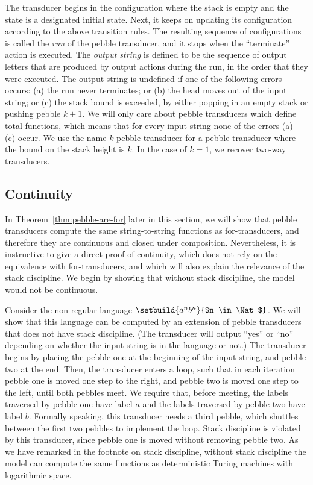 The transducer begins in the configuration where the stack is empty and  the state is a  designated initial state. Next, it keeps on updating its configuration according to the above transition rules. The resulting sequence of configurations is called the \emph{run} of the pebble transducer, and it stops when the ``terminate'' action is executed. The \emph{output string} is defined to be the sequence of output letters that are produced by output actions during the run,  in the order that they were executed.  The output string is undefined if one of the following errors occurs: (a) the run never terminates; or (b) the head moves out of the input string; or (c) the stack bound is exceeded, by either popping in an empty stack or pushing pebble $k+1$. We will only care about pebble transducers which define total functions, which means that for every input string none of the errors (a) -- (c)  occur. 
We use the name $k$-pebble transducer for a pebble transducer where the bound on the stack height is $k$. In the case of $k=1$, 
    we recover  two-way transducers.

\subsection{Continuity}
\label{sec:continuity-pebble}
In Theorem~\ref{thm:pebble-are-for} later in this section, we will show that pebble transducers compute the same string-to-string functions as for-transducers, and therefore they are continuous and closed under composition. Nevertheless, it is instructive to give a direct proof of continuity, which does not rely on the equivalence with for-transducers, and which will also explain the relevance of the stack discipline. We begin by showing that without stack discipline, the model would not be continuous.

\begin{myexample}
    \label{ex:importance-of-stack-discipline}
    Consider the non-regular language $\setbuild{a^n b^n}{$n \in \Nat$}$. We will show that this language can be computed by an extension of pebble transducers that does not have stack discipline. (The transducer will output ``yes'' or ``no'' depending on whether the input string is in the language or not.) The transducer begins by placing the pebble one at the beginning of the input string, and pebble two at the end. Then, the transducer enters a loop, such that in each iteration pebble one is moved one step to the right, and pebble two is moved one step to the left, until both pebbles meet. We require that, before meeting, the labels traversed by pebble one have label $a$ and the labels traversed by pebble two have label $b$. Formally speaking, this transducer needs a third pebble, which shuttles between the first two pebbles to implement the loop. Stack discipline is violated by this transducer, since pebble one is moved without removing pebble two.  As we have remarked in the footnote on stack discipline, without stack discipline the model can compute the same functions as deterministic Turing machines with logarithmic space.
\end{myexample}


